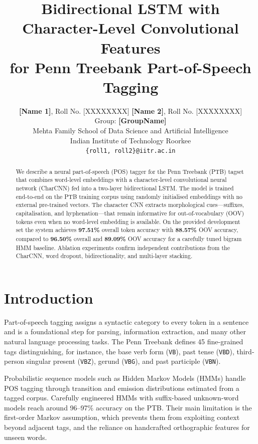 \documentclass[11pt]{article}
\title{Bidirectional LSTM with Character-Level Convolutional Features\\
       for Penn Treebank Part-of-Speech Tagging}
\author{
  \textbf{[Name 1]}, Roll No. [XXXXXXXX] \quad \textbf{[Name 2]}, Roll No. [XXXXXXXX] \\
  Group: \textbf{[GroupName]} \\
  Mehta Family School of Data Science and Artificial Intelligence \\
  Indian Institute of Technology Roorkee \\
  \texttt{\{roll1, roll2\}@iitr.ac.in}
}
\newcommand{\BiLSTMCNN}{97.51}   %
\newcommand{\BiLSTMOOV}{88.57}   %
\newcommand{\HMMALL}{96.50}      %
\newcommand{\HMMOOV}{89.09}      %
\begin{document}
\maketitle

\begin{abstract}
We describe a neural part-of-speech (POS) tagger for the Penn Treebank (PTB)
tagset that combines word-level embeddings with a character-level
convolutional neural network (CharCNN) fed into a two-layer bidirectional
LSTM.  The model is trained end-to-end on the PTB training corpus using
randomly initialised embeddings with no external pre-trained vectors.  The
character CNN extracts morphological cues—suffixes, capitalisation, and
hyphenation—that remain informative for out-of-vocabulary (OOV) tokens even
when no word-level embedding is available.  On the provided development set
the system achieves \textbf{\BiLSTMCNN\%} overall token accuracy with
\textbf{\BiLSTMOOV\%} OOV accuracy, compared to \textbf{\HMMALL\%} overall and \textbf{\HMMOOV\%} OOV accuracy for a carefully tuned bigram HMM baseline.  Ablation
experiments confirm independent contributions from the CharCNN, word dropout,
bidirectionality, and multi-layer stacking.
\end{abstract}

\section{Introduction}

Part-of-speech tagging assigns a syntactic category to every token in a
sentence and is a foundational step for parsing, information extraction, and
many other natural language processing tasks.  The Penn Treebank
\cite{marcus-etal-1993-building} defines 45 fine-grained tags distinguishing,
for instance, the base verb form (\texttt{VB}), past tense (\texttt{VBD}),
third-person singular present (\texttt{VBZ}), gerund (\texttt{VBG}), and past
participle (\texttt{VBN}).

Probabilistic sequence models such as Hidden Markov Models (HMMs)
\cite{brants-2000-tnt} handle POS tagging through transition and emission
distributions estimated from a tagged corpus.  Carefully engineered HMMs with
suffix-based unknown-word models reach around 96--97\% accuracy on the PTB.
Their main limitation is the first-order Markov assumption, which prevents
them from exploiting context beyond adjacent tags, and the reliance on
handcrafted orthographic features for unseen words.
\end{document}
